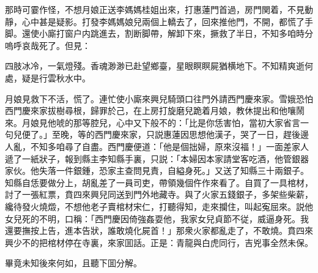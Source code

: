 那時可霎作怪，不想月娘正送李媽媽桂姐出來，打惠蓮門首過，房門関着，不見動靜，心中甚是疑影。打發李媽媽娘兒兩個上轎去了，回來推他門，不開，都慌了手脚。還使小廝打窗户内跳進去，割断脚帶，解卸下來，撅救了半日，不知多咱時分嗚呼哀哉死了。但見：

四肢冰冷，一氣燈殘。香魂渺渺已赴望鄉臺，星眼瞑瞑屍猶横地下。不知精爽逝何處，疑是行雲秋水中。

月娘見救下不活，慌了。連忙使小廝來興兒騎頭口往門外請西門慶來家。雪娥恐怕西門慶來家拔樹尋根，歸罪於己，在上房打旋磨兒跪着月娘，教休提出和他嚷鬧來。月娘見他唬的那等腔兒，心中又下般不的：「比是你恁害怕，當初大家省言一句兒便了。」至晚，等的西門慶來家，只説惠蓮因思想他漢子，哭了一日，趕後邊人亂，不知多咱尋了自盡。西門慶便道：「他是個拙婦，原來沒福！」一面差家人遞了一紙狀子，報到縣主李知縣手裏，只説：「本婦因本家請堂客吃酒，他管銀器家伙。他失落一件銀鍾，恐家主查問見責，自縊身死。」又送了知縣三十兩銀子。知縣自恁要做分上，胡亂差了一員司吏，帶領幾個仵作來看了。自買了一具棺材，討了一張紅票，賁四來興兒同送到門外地藏寺。與了火家五錢銀子，多架些柴薪，纔待發火燒燬，不想他老子賣棺材宋仁，打聽得知，走來攔住，叫起寃屈來。説他女兒死的不明，口稱：「西門慶因倚強姦耍他，我家女兒貞節不従，威逼身死。我還要撫按上告，進本告狀，誰敢燒化屍首！」那衆火家都亂走了，不敢燒。賁四來興少不的把棺材停在寺裏，來家囬話。正是：青龍與白虎同行，吉兇事全然未保。

畢竟未知後來何如，且聽下囬分解。

